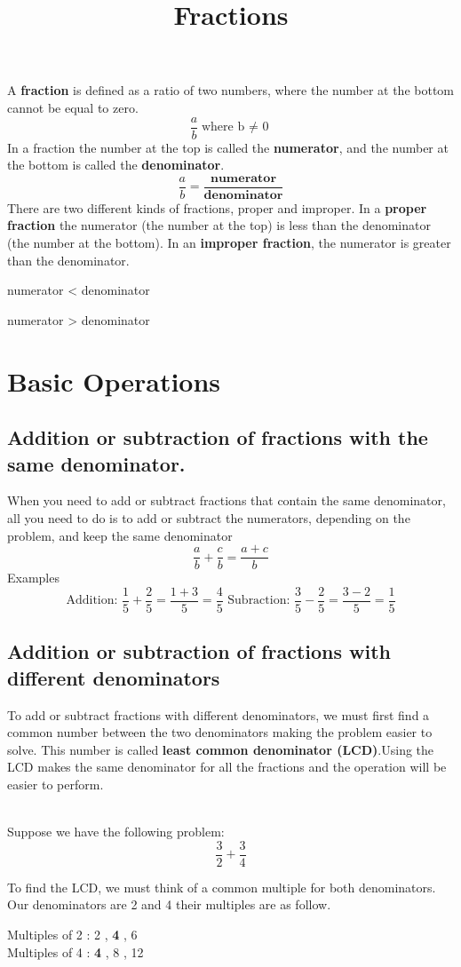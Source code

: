 \documentclass[11pt]{article}
\begin{document}
\title{Fractions}
A \textbf{fraction} is defined as a ratio of two numbers, where the number at the bottom cannot be equal to zero.
$$\frac{a}{b} \text{where b $\neq$ 0}$$
In a fraction the number at the top is called the 
\textbf{numerator}, and the number at the bottom is called the \textbf{denominator}.
$$\frac{a}{b} = \frac{\textbf{numerator}}{\textbf{denominator}}$$
There are two different kinds of fractions, proper and improper. In a \textbf{proper fraction} the numerator (the number at the top) is less than the denominator (the number at the bottom). In an \textbf{improper fraction}, the numerator is greater than the denominator.  
\centerline{ numerator < denominator}
\centerline{ numerator > denominator}

\section{Basic Operations}
\subsection{Addition or subtraction of fractions with the same denominator.}
When you need to add or subtract fractions that contain the same denominator, all you need 
to do is to add or subtract the numerators, depending on the problem, and keep the same 
denominator
$$\frac{a}{b}+\frac{c}{b} = \frac{a+c}{b}$$
Examples $$\text{Addition: } \frac{1}{5}+\frac{2}{5} = \frac{1+3}{5} = \frac{4}{5}\text{ Subraction: } \frac{3}{5}-\frac{2}{5} = \frac{3-2}{5} = \frac{1}{5}$$
\subsection{Addition or subtraction of fractions with different denominators}
To add or subtract fractions with different denominators, we must first find a common number between the two denominators making the problem easier to solve. This number is called 
\textbf{least common denominator (LCD)}.Using the LCD makes the same denominator for all the fractions and the operation will be easier to perform.

\\Suppose we have the following problem: $$\frac{3}{2}+\frac{3}{4}$$

To find the LCD, we must think of a common multiple for both denominators. Our denominators are 2 and 4 their multiples are as follow.

Multiples of 2 : 2 , \textbf{4} , 6  
\\ Multiples of 4 : \textbf{4} , 8  , 12  
\end{document}
